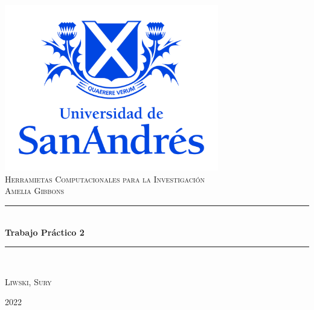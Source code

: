 \documentclass[9pt]{article}
\date{}
\begin{document}
\begin{titlepage} %
	\newcommand{\HRule}{\rule{\linewidth}{0.5mm}} %
	
	\center %
	
	\includegraphics[width=0.7\textwidth]{logoudesa.jpg}\\[0.8cm]
	
	\textsc{\LARGE Herramietas Computacionales para la Investigación}\\[0.5cm] %
	
	\textsc{\Large Amelia Gibbons}\\

	\textcolor{white}{\HRule}\\[0.6cm]
	\huge\bfseries Trabajo Práctico 2 
	\textcolor{white}{\HRule}\\[1.5cm]
	\begin{center}
		\Large
		\textsc{Liwski, Sury}\\
	\end{center}
	
	
	\vfill\vfill\vfill %
	{\large 2022}
	\vfill
	
\end{titlepage}
\end{document}
